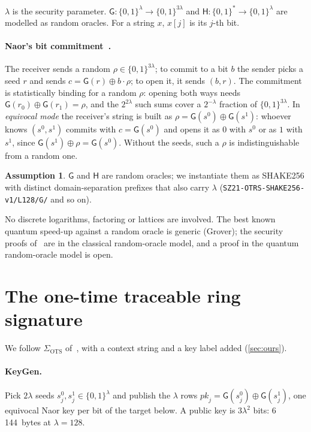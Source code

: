 \documentclass[11pt,a4paper]{article}
\newcommand{\bits}{\{0,1\}}
\newcommand{\pk}{\mathit{pk}}
\newcommand{\Gf}{\mathsf{G}}
\newcommand{\Hf}{\mathsf{H}}
\newcommand{\KeyGen}{\textsf{KeyGen}}
\theoremstyle{definition}
\newtheorem{assumption}{Assumption}
\begin{document}
$\lambda$ is the security parameter. $\Gf : \bits^\lambda \to
\bits^{3\lambda}$ and $\Hf : \bits^* \to \bits^\lambda$ are modelled as
random oracles. For a string $x$, $x[j]$ is its $j$-th bit.

\paragraph{Naor's bit commitment~\cite{Naor91}.} The receiver sends a
random $\rho \in \bits^{3\lambda}$; to commit to a bit $b$ the sender picks
a seed $r$ and sends $c = \Gf(r) \oplus b \cdot \rho$; to open it, it sends
$(b, r)$. The commitment is statistically binding for a random $\rho$:
opening both ways needs $\Gf(r_0) \oplus \Gf(r_1) = \rho$, and the
$2^{2\lambda}$ such sums cover a $2^{-\lambda}$ fraction of
$\bits^{3\lambda}$. In \emph{equivocal mode} the receiver's string is
built as $\rho = \Gf(s^0) \oplus \Gf(s^1)$: whoever knows $(s^0, s^1)$
commits with $c = \Gf(s^0)$ and opens it as $0$ with $s^0$ or as $1$ with
$s^1$, since $\Gf(s^1) \oplus \rho = \Gf(s^0)$. Without the seeds, such a
$\rho$ is indistinguishable from a random one.

\begin{assumption}
$\Gf$ and $\Hf$ are random oracles; we instantiate them as SHAKE256 with
distinct domain-separation prefixes that also carry $\lambda$
(\texttt{SZ21-OTRS-SHAKE256-v1/L128/G/} and so on).
\end{assumption}

No discrete logarithms, factoring or lattices are involved. The best known
quantum speed-up against a random oracle is generic (Grover); the security
proofs of~\cite{SZ21} are in the classical random-oracle model, and a
proof in the quantum random-oracle model is open.

\section{The one-time traceable ring signature}
\label{sec:construction}

We follow $\Sigma_{\mathrm{OTS}}$ of~\cite[Fig.~1]{SZ21}, with a context
string and a key label added (\cref{sec:ours}).

\paragraph{\KeyGen.} Pick $2\lambda$ seeds $s^0_j, s^1_j \in
\bits^\lambda$ and publish the $\lambda$ rows $\pk_j = \Gf(s^0_j) \oplus
\Gf(s^1_j)$, one equivocal Naor key per bit of the target below. A public
key is $3\lambda^2$ bits: 6\,144~bytes at $\lambda = 128$.
\end{document}
